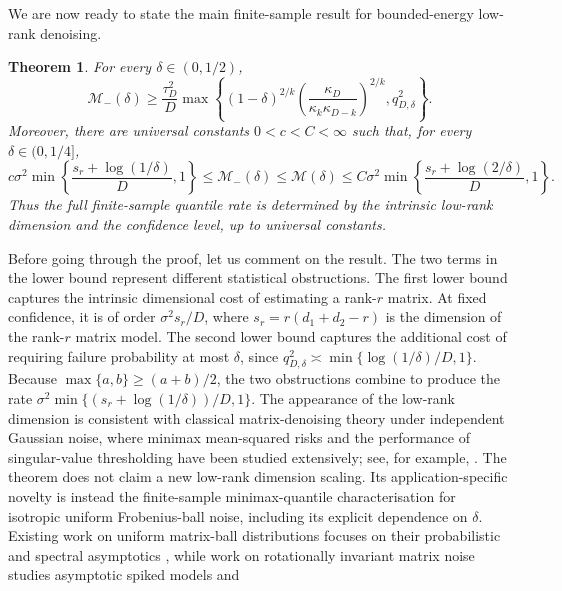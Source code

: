 \documentclass[11pt]{article}
\newtheorem{theorem}{Theorem}[section]
\theoremstyle{definition}
\theoremstyle{remark}
\newcommand{\1}{\boldsymbol{1}}
\begin{document}
We are now ready to state the main finite-sample result for bounded-energy
low-rank denoising.

\begin{theorem}
\label{prop:boundedEnergyLowRankQuantile}
For every $\delta\in(0,1/2)$,
\begin{equation}
\mathcal M_-(\delta)
\geq
\frac{\tau_D^2}{D}
\max\left\{
(1-\delta)^{2/k}
\left(
\frac{\kappa_D}{\kappa_k\kappa_{D-k}}
\right)^{2/k},
q_{D,\delta}^2
\right\}.
\label{eq:boundedEnergyLowRankExactLower}
\end{equation}
Moreover, there are universal constants $0<c<C<\infty$ such that, for every
$\delta\in(0,1/4]$,
\begin{equation}
c\sigma^2
\min\left\{
\frac{s_r+\log(1/\delta)}{D},1
\right\}
\leq
\mathcal M_-(\delta)
\leq
\mathcal M(\delta)
\leq
C\sigma^2
\min\left\{
\frac{s_r+\log(2/\delta)}{D},1
\right\}.
\label{eq:boundedEnergyLowRankRate}
\end{equation}
Thus the full finite-sample quantile rate is determined by the intrinsic
low-rank dimension and the confidence level, up to universal constants.
    
\end{theorem}
Before going through the proof, let us comment on the result. The two terms in the lower bound represent different statistical
obstructions. The first lower bound captures the intrinsic dimensional cost of estimating
a rank-\(r\) matrix. At fixed confidence, it is of order
\(\sigma^2s_r/D\), where \(s_r=r(d_1+d_2-r)\) is the dimension of the
rank-\(r\) matrix model. The second lower bound captures the additional
cost of requiring failure probability at most \(\delta\), since
\(q_{D,\delta}^2\asymp
\min\{\log(1/\delta)/D,1\}\). Because
\(\max\{a,b\}\geq(a+b)/2\), the two obstructions combine to produce the
rate \(\sigma^2\min\{(s_r+\log(1/\delta))/D,1\}\).
The appearance of the low-rank dimension is consistent with classical
matrix-denoising theory under independent Gaussian noise, where minimax
mean-squared risks and the performance of singular-value thresholding have
been studied extensively; see, for example,
\cite{DonohoGavish2014}. The theorem does not claim a new low-rank
dimension scaling. Its application-specific novelty is instead the
finite-sample minimax-quantile characterisation for isotropic uniform
Frobenius-ball noise, including its explicit dependence on \(\delta\).
Existing work on uniform matrix-ball distributions focuses on their
probabilistic and spectral asymptotics \cite{KaufmannThale2022}, while work
on rotationally invariant matrix noise studies asymptotic spiked models and
\end{document}
